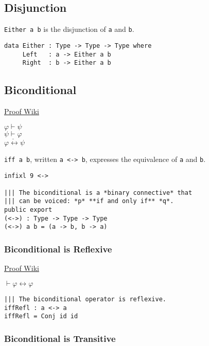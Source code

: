 \documentclass{acm_proc_article-sp}
\renewcommand{\iff}{\leftrightarrow}
\begin{document}
\subsection{Disjunction}\label{disjunction}

\texttt{Either a b} is the disjunction of
\texttt{a} and \texttt{b}.

\begin{verbatim}
data Either : Type -> Type -> Type where
     Left   : a -> Either a b
     Right  : b -> Either a b     
\end{verbatim}

\newpage

\subsection{Biconditional}\label{biconditional}

\href{https://proofwiki.org/wiki/Definition:Biconditional}{Proof Wiki}

\(\varphi \vdash \psi\)\\
\(\underline{\psi \vdash \varphi}\)\\
\(\varphi \iff \psi\)

\texttt{iff a b}, written \texttt{a <-> b},
expresses the equivalence of \texttt{a} and
\texttt{b}.

\begin{verbatim}
infixl 9 <->

||| The biconditional is a *binary connective* that
||| can be voiced: *p* **if and only if** *q*.
public export
(<->) : Type -> Type -> Type
(<->) a b = (a -> b, b -> a)
\end{verbatim}

\subsubsection{Biconditional is
Reflexive}\label{biconditional-is-reflexive}

\href{https://proofwiki.org/wiki/Biconditional_is_Reflexive}{Proof Wiki}

\(\vdash \varphi \iff \varphi\)

\begin{verbatim}
||| The biconditional operator is reflexive.
iffRefl : a <-> a
iffRefl = Conj id id
\end{verbatim}

\subsubsection{Biconditional is
Transitive}\label{biconditional-is-transitive}
\end{document}
